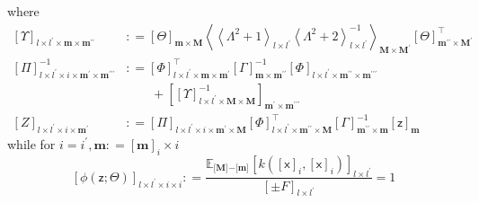 \documentclass[preprint,12pt]{elsarticle}
\newcommand*{\M}[1]{\ensuremath{#1}\xspace}
\newcommand*{\x}{\times}
\newcommand*{\mi}[1]{\mathbf{#1}}
\newcommand*{\rv}[1]{\mathsf{#1}}
\newcommand*{\te}[2][]{\left\lbrack{#2}\right\rbrack_{#1}}
\newcommand*{\tse}[2][]{\mi{\lbrack#2\rbrack}_{#1}}
\newcommand*{\diag}[2][]{\left\langle{#2}\right\rangle_{#1}}
\newcommand*{\deq}{\M{\mathrel{\mathop:}=}}
\newcommand*{\evt}[3][]{\mathbb{E}_{#3}^{#1}\!#2}
\begin{document}
            where
            \begin{equation*}
                \begin{aligned}
                    \te[l\x l^{\prime}\x\mi{m}\x\mi{m^{\prime\prime}}]{\Upsilon} &\deq \te[\mi{m}\x\mi{M}]{\Theta}
                    \diag[\mi{M}\x\mi{M^{\prime}}]{\diag[l\x l^{\prime}]{\Lambda^{2}+1}\diag[l\x l^{\prime}]{\Lambda^{2}+2}^{-1}} \te[\mi{m^{\prime\prime}}\x\mi{M^{\prime}}]{\Theta}^{\intercal} \\
                    \te[l\x l^{\prime}\x i\x\mi{m^{\prime}}\x\mi{m^{\prime\prime\prime}}]{\Pi}^{-1} &\deq \te[l\x l^{\prime}\x\mi{m}\x\mi{m^{\prime}}]{\Phi}^{\intercal}
                    \te[\mi{m}\x\mi{m^{\prime\prime}}]{\Gamma}^{-1} \te[l\x l^{\prime}\x\mi{m^{\prime\prime}}\x\mi{m^{\prime\prime\prime}}]{\Phi} \\
                    &\phantom{\deq}\ +\te[\mi{m^{\prime}}\x\mi{m^{\prime\prime\prime}}]{\te[l\x l^{\prime}\x\mi{M}\x\mi{M}]{\Upsilon}^{-1}} \\
                    \te[l\x l^{\prime}\x i\x\mi{m^{\prime}}]{Z} &\deq 
                    \te[l\x l^{\prime}\x i\x\mi{m^{\prime}}\x\mi{M}]{\Pi}
                    \te[l\x l^{\prime}\x\mi{m^{\prime\prime}}\x\mi{M}]{\Phi}^{\intercal}
                    \te[\mi{m^{\prime\prime}}\x\mi{m}]{\Gamma}^{-1}
                    \te[\mi{m}]{\rv{z}}
                \end{aligned}
            \end{equation*}
            while for $i=i^{\prime}, \mi{m} \deq \te[i]{\mi{m}}\x i$
            \begin{equation*}
                \te[l\x l^{\prime}\x i\x i]{\phi(\rv{z}; \Theta)} \deq \frac{\evt{\te[l\x l^{\prime}]{k(\te[i]{\rv{x}},\te[i]{\rv{x}})}}{\tse{M}\mi{-}\tse{m}}}{\te[l\x l^{\prime}]{\pm F}}
                = 1
            \end{equation*}
\end{document}
